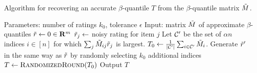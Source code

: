 \begin{algorithm}[t!]
\caption{Algorithm for recovering an accurate $\beta$-quantile $T$ from the $\beta$-quantile matrix $\tilde{M}$.}
\label{alg:recover-T}
\begin{algorithmic}[1]
\State Parameters: number of ratings $k_0$, tolerance $\epsilon$
\State Input: matrix $\tilde{M}$ of approximate $\beta$-quantiles
\State $\tilde{r} \gets 0 \in \mathbf{R}^m$
\State $\tilde{r}_j \gets $ noisy rating for item $j$
\EndFor
\State Let $\mathcal{C}'$ be the set of $\alpha n$ indices $i \in [n]$ for which 
       $\sum_j \tilde{M}_{ij}\tilde{r}_j$ is largest.
\State $T_0 \gets \frac{1}{|\mathcal{C}'|} \sum_{i \in \mathcal{C}'} \tilde{M}_i$. 
\State Generate $\tilde{r}'$ in the same way as $\tilde{r}$ by randomly selecting $k_0$ additional indices
\State $T \gets \textsc{RandomizedRound}(T_0)$ 
\State Output $T$
\EndIf
\EndWhile
\end{algorithmic}
\end{algorithm}
